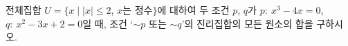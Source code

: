 전체집합 $U=\{x \mid |x|\le 2$, $x$는 정수$\}$에 대하여 두 조건 $p$, $q$가 $p:\ x^3-4x=0$, $q:\ x^2-3x+2=0$일 때, 조건 ‘${\sim} p$ 또는 ${\sim} q$’의 진리집합의 모든 원소의 합을 구하시오.

